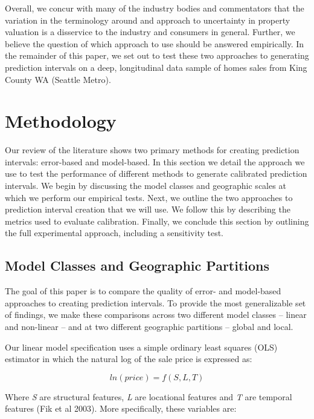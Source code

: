 \documentclass[colTwo]{anon}
\theoremstyle{definition}
\begin{document}
Overall, we concur with many of the industry bodies and commentators that the variation in the terminology around and approach to uncertainty in property valuation is a disservice to the industry and consumers in general.  Further, we believe the question of which approach to use should be answered empirically.  In the remainder of this paper, we set out to test these two approaches to generating prediction intervals on a deep, longitudinal data sample of homes sales from King County WA (Seattle Metro).

\section{Methodology}

Our review of the literature shows two primary methods for creating prediction intervals: error-based and model-based. In this section we detail the approach we use to test the performance of different methods to generate calibrated prediction intervals. We begin by discussing the model classes and geographic scales at which we perform our empirical tests.  Next, we outline the two approaches to prediction interval creation that we will use.  We follow this by describing the metrics used to evaluate calibration.  Finally, we conclude this section by outlining the full experimental approach, including a sensitivity test.

\subsection{Model Classes and Geographic Partitions}

The goal of this paper is to compare the quality of error- and model-based approaches to creating prediction intervals.  To provide the most generalizable set of findings, we make these comparisons across two different model classes -- linear and non-linear -- and at two different geographic partitions -- global and local.

Our linear model specification uses a simple ordinary least squares (OLS) estimator in which the natural log of the sale price is expressed as:

\[ln(price) = f(S, L, T)\]

Where \textit{S} are structural features, \textit{L} are locational features and \textit{T} are temporal features (Fik et al 2003).  More specifically, these variables are:
\end{document}
